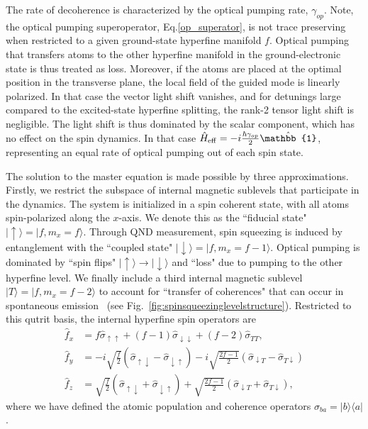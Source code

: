 \documentclass[preprint,aps,pra,onecolumn,superscriptaddress]{revtex4-1} %
\def\bra#1{\langle{#1}\rvert}%
\def\ket#1{\lvert{#1}\rangle}%
\begin{document}
The rate of decoherence is characterized by the optical pumping rate, $\gamma_{op}$.  Note, the optical pumping superoperator, Eq.\eqref{op_superator},  is not trace preserving when restricted to a given ground-state hyperfine manifold $f$.  Optical pumping that transfers atoms to the other hyperfine manifold in the ground-electronic state is thus treated as loss. Moreover, if the atoms are placed at the optimal position in the transverse plane, the local field of the guided mode is linearly polarized.  In that case the vector light shift vanishes, and for detunings large compared to the excited-state hyperfine splitting, the rank-2 tensor light shift is negligible. The light shift is thus dominated by the scalar component, which has no effect on the spin dynamics. In that case $\hat{H}_{\rm eff} = -i \frac{\hbar\gamma_{op}}{2} \hat{\mathbb{1}}$, representing an equal rate of optical pumping out of each spin state.

The solution to the master equation is made possible by three approximations. Firstly, we restrict the subspace of internal magnetic sublevels that participate in the dynamics.  The system is initialized in a spin coherent state, with all atoms spin-polarized along the $x$-axis.  We denote this as the ``fiducial state" $\ket{\uparrow} = \ket{f, m_x =f}$.   Through QND measurement, spin squeezing is induced by entanglement with the  ``coupled state"  $\ket{\downarrow} = \ket{f, m_x=f-1}$.  Optical pumping is dominated by ``spin flips" $\ket{\uparrow}\rightarrow \ket{\downarrow}$ and ``loss" due to pumping to the other hyperfine level.  We finally include a third internal magnetic sublevel $\ket{T} = \ket{f, m_x=f-2}$ to account for  ``transfer of coherences" that can occur in spontaneous emission~\cite{Norris2012Enhanced,Norris2014} (see Fig.~\ref{fig:spinsqueezinglevelstructure}).  Restricted to this qutrit basis, the internal hyperfine spin operators are
\begin{subequations}\label{eq:f_in_xbasis}
\begin{align}
\hat{f}_x &= f \hat{\sigma}_{\uparrow \uparrow} +(f-1) \hat{\sigma}_{\downarrow \downarrow} + (f-2)  \hat{\sigma}_{T T}, \\
\hat{f}_y &=-i \sqrt{\frac{f}{2}} \left(\hat{\sigma}_{\uparrow \downarrow} - \hat{\sigma}_{\downarrow \uparrow}\right) -i \sqrt{\frac{2f-1}{2}}  \left(\hat{\sigma}_{\downarrow T} - \hat{\sigma}_{T \downarrow }\right) \\
\hat{f}_z &= \sqrt{\frac{f}{2}} \left(\hat{\sigma}_{\uparrow \downarrow} + \hat{\sigma}_{\downarrow \uparrow}\right) + \sqrt{\frac{2f-1}{2}}  \left(\hat{\sigma}_{\downarrow T} + \hat{\sigma}_{T \downarrow }\right),
\end{align}
\end{subequations}
where we have defined the atomic population and coherence operators $\hat{\sigma}_{ba}=\ket{b}\bra{a}$.
\end{document}
